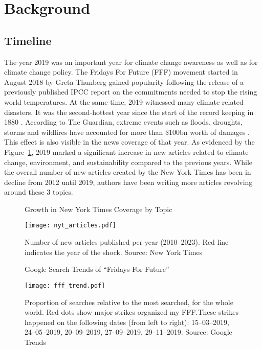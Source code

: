 \documentclass[12pt]{article}
\begin{document}
\section{Background}\label{sect:background}

\subsection{Timeline} 

The year 2019 was an important year for climate change awareness as well as for climate change policy. The Fridays For Future (FFF) movement started in August 2018 by Greta Thunberg gained popularity following the release of a previously published IPCC report on the commitments needed to stop the rising world temperatures. At the same time, 2019 witnessed many climate-related disasters. It was the second-hottest year since the start of the record keeping in 1880 \parencite{noaa2019global}. According to The Guardian, extreme events such as floods, droughts, storms and wildfires have accounted for more than \$100bn worth of damages \parencite{harvey2019climate}. This effect is also visible in the news coverage of that year. As evidenced by the Figure~\ref{fig:news_trends}, 2019 marked a significant increase in new articles related to climate change, environment, and sustainability compared to the previous years. While the overall number of new articles created by the New York Times has been in decline from 2012 until 2019, authors have been writing more articles revolving around these 3 topics.


\begin{figure}[t]
    \caption{Growth in New York Times Coverage by Topic}\label{fig:news_trends}
    \texttt{[image: nyt\_articles.pdf]}
    \captionsetup{font=footnotesize}
    \caption*{Number of new articles published per year (2010--2023). Red line indicates the year of the shock. Source: New York Times}
\end{figure}

\begin{figure}[t]
    \caption{Google Search Trends of ``Fridays For Future''}\label{fig:fff_trend}
    \texttt{[image: fff\_trend.pdf]}
    \captionsetup{font=footnotesize}
    \caption*{Proportion of searches relative to the most searched, for the whole world. Red dots show major strikes organized my FFF.\@ These strikes happened on the following dates (from left to right): 15--03--2019, 24--05--2019, 20--09--2019, 27--09--2019, 29--11--2019. Source: Google Trends}
\end{figure}
\end{document}
